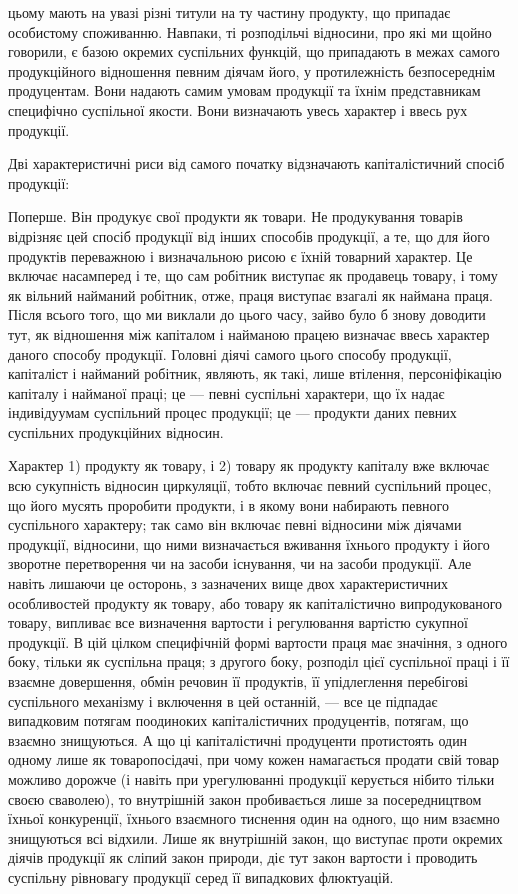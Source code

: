 цьому мають на увазі різні титули на ту частину продукту, що припадає
особистому споживанню. Навпаки, ті розподільчі відносини, про які ми щойно
говорили, є базою окремих суспільних функцій, що припадають в межах самого
продукційного відношення певним діячам його, у протилежність безпосереднім
продуцентам. Вони надають самим умовам продукції та їхнім представникам специфічно
суспільної якости. Вони визначають увесь характер і ввесь рух продукції.

Дві характеристичні риси від самого початку відзначають капіталістичний
спосіб продукції:

Поперше. Він продукує свої продукти як товари. Не продукування товарів
відрізняє цей спосіб продукції від інших способів продукції, а те, що для
його продуктів переважною і визначальною рисою є їхній товарний характер. Це
включає насамперед і те, що сам робітник виступає як продавець товару, і тому
як вільний найманий робітник, отже, праця виступає взагалі як наймана праця.
Після всього того, що ми виклали до цього часу, зайво було б знову доводити
тут, як відношення між капіталом і найманою працею визначає ввесь характер даного
способу продукції. Головні діячі самого цього способу продукції, капіталіст і
найманий робітник, являють, як такі, лише втілення, персоніфікацію капіталу і
найманої праці; це — певні суспільні характери, що їх надає індивідуумам суспільний
процес продукції; це — продукти даних певних суспільних продукційних
відносин.

Характер 1) продукту як товару, і 2) товару як продукту капіталу вже
включає всю сукупність відносин циркуляції, тобто включає певний суспільний
процес, що його мусять проробити продукти, і в якому вони набирають
певного суспільного характеру; так само він включає певні відносини між
діячами продукції, відносини, що ними визначається вживання їхнього продукту
і його зворотне перетворення чи на засоби існування, чи на засоби
продукції. Але навіть лишаючи це осторонь, з зазначених вище двох характеристичних
особливостей продукту як товару, або товару як капіталістично
випродукованого товару, випливає все визначення вартости і регулювання вартістю
сукупної продукції. В цій цілком специфічній формі вартости праця має
значіння, з одного боку, тільки як суспільна праця; з другого боку, розподіл
цієї суспільної праці і її взаємне довершення, обмін речовин її продуктів, її
упідлеглення перебігові суспільного механізму і включення в цей останній, —
все це підпадає випадковим потягам поодиноких капіталістичних продуцентів,
потягам, що взаємно знищуються. А що ці капіталістичні продуценти протистоять
один одному лише як товаропосідачі, при чому кожен намагається
продати свій товар можливо дорожче (і навіть при урегулюванні продукції
керується нібито тільки своєю сваволею), то внутрішній закон пробивається
лише за посередництвом їхньої конкуренції, їхнього взаємного тиснення один
на одного, що ним взаємно знищуються всі відхили. Лише як внутрішній
закон, що виступає проти окремих діячів продукції як сліпий закон природи,
діє тут закон вартости і проводить суспільну рівновагу продукції серед її випадкових
флюктуацій.

